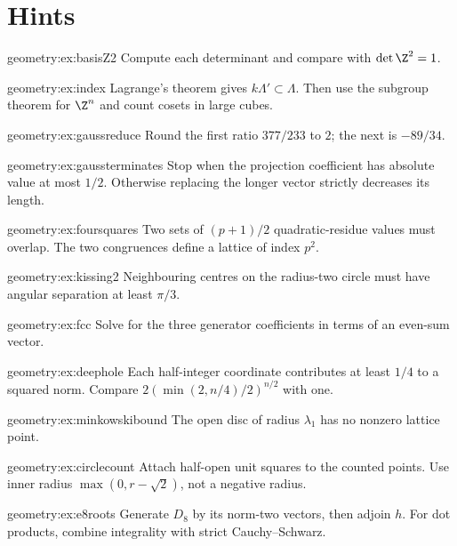 \section{Hints}

\begin{hint}{geometry:ex:basisZ2}
Compute each determinant and compare with $\det\Z^2=1$.
\end{hint}
\begin{hint}{geometry:ex:index}
Lagrange's theorem gives $k\Lambda'\subset\Lambda$.
Then use the subgroup theorem for $\Z^n$ and count cosets in large cubes.
\end{hint}
\begin{hint}{geometry:ex:gaussreduce}
Round the first ratio $377/233$ to $2$; the next is $-89/34$.
\end{hint}
\begin{hint}{geometry:ex:gaussterminates}
Stop when the projection coefficient has absolute value at most $1/2$.
Otherwise replacing the longer vector strictly decreases its length.
\end{hint}
\begin{hint}{geometry:ex:foursquares}
Two sets of $(p+1)/2$ quadratic-residue values must overlap.
The two congruences define a lattice of index $p^2$.
\end{hint}
\begin{hint}{geometry:ex:kissing2}
Neighbouring centres on the radius-two circle must have angular separation
at least $\pi/3$.
\end{hint}
\begin{hint}{geometry:ex:fcc}
Solve for the three generator coefficients in terms of an even-sum vector.
\end{hint}
\begin{hint}{geometry:ex:deephole}
Each half-integer coordinate contributes at least $1/4$ to a squared norm.
Compare $2(\min(2,n/4)/2)^{n/2}$ with one.
\end{hint}
\begin{hint}{geometry:ex:minkowskibound}
The open disc of radius $\lambda_1$ has no nonzero lattice point.
\end{hint}
\begin{hint}{geometry:ex:circlecount}
Attach half-open unit squares to the counted points. Use inner radius
$\max(0,r-\sqrt2)$, not a negative radius.
\end{hint}
\begin{hint}{geometry:ex:e8roots}
Generate $D_8$ by its norm-two vectors, then adjoin $h$.
For dot products, combine integrality with strict Cauchy--Schwarz.
\end{hint}

